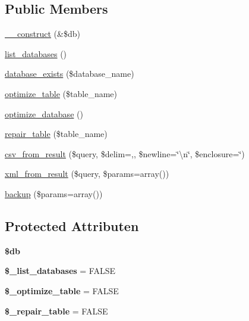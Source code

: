 \subsection*{Public Members}
\begin{DoxyCompactItemize}
\item 
\mbox{\hyperlink{class_c_i___d_b__utility_aaf2ef772755ec6f361d44e16cc9ffd69}{\+\_\+\+\_\+construct}} (\&\$db)
\item 
\mbox{\hyperlink{class_c_i___d_b__utility_a8486b247a8868504b055622cb2dd34d3}{list\+\_\+databases}} ()
\item 
\mbox{\hyperlink{class_c_i___d_b__utility_ac0ba63aa14b19a37d4773fcc252bde81}{database\+\_\+exists}} (\$database\+\_\+name)
\item 
\mbox{\hyperlink{class_c_i___d_b__utility_a6aed9274f43b64eeee607d172b51529d}{optimize\+\_\+table}} (\$table\+\_\+name)
\item 
\mbox{\hyperlink{class_c_i___d_b__utility_acb26598e177f525b39978f6dfca1f212}{optimize\+\_\+database}} ()
\item 
\mbox{\hyperlink{class_c_i___d_b__utility_a41a627004d26198c69bf466eef7eaeeb}{repair\+\_\+table}} (\$table\+\_\+name)
\item 
\mbox{\hyperlink{class_c_i___d_b__utility_aba64f8ac8169c018d251eefe95de1c84}{csv\+\_\+from\+\_\+result}} (\$query, \$delim=\textquotesingle{},\textquotesingle{}, \$newline=\char`\"{}\textbackslash{}n\char`\"{}, \$enclosure=\textquotesingle{}\char`\"{}\textquotesingle{}) 
\item 
\mbox{\hyperlink{class_c_i___d_b__utility_a09decb7db409060365ad2c20072523f9}{xml\+\_\+from\+\_\+result}} (\$query, \$params=array())
\item 
\mbox{\hyperlink{class_c_i___d_b__utility_abe2b9d47f950dfbaf8c6ec757a9af9a2}{backup}} (\$params=array())
\end{DoxyCompactItemize}
\subsection*{Protected Attributen}
\begin{DoxyCompactItemize}
\item 
\mbox{\label{class_c_i___d_b__utility_a1fa3127fc82f96b1436d871ef02be319}} 
{\bfseries \$db}
\item 
\mbox{\label{class_c_i___d_b__utility_afe3a5b80562d93d6bc7e2b53c95b7e5a}} 
{\bfseries \$\+\_\+list\+\_\+databases} = F\+A\+L\+SE
\item 
\mbox{\label{class_c_i___d_b__utility_a083199e5c22c78912dae0a47bb2d7fad}} 
{\bfseries \$\+\_\+optimize\+\_\+table} = F\+A\+L\+SE
\item 
\mbox{\label{class_c_i___d_b__utility_a5cf925cbd52e3f6ba5b7ada3fa436efc}} 
{\bfseries \$\+\_\+repair\+\_\+table} = F\+A\+L\+SE
\end{DoxyCompactItemize}


